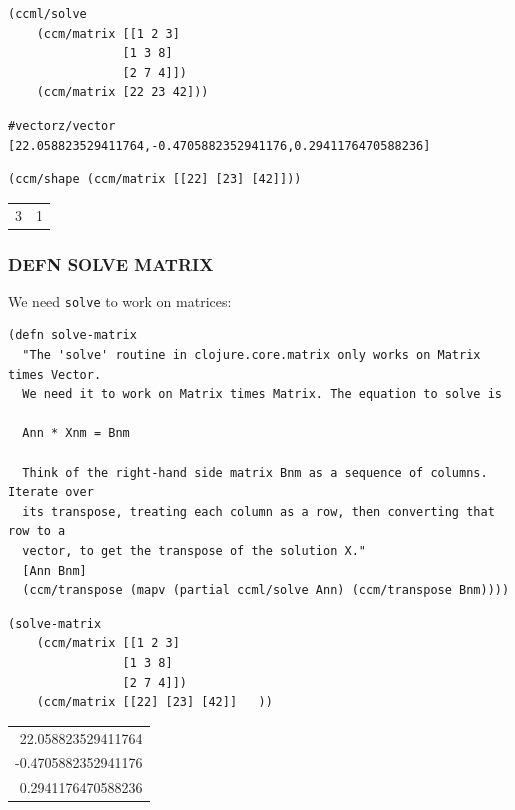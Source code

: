 \documentclass[10pt,oneside,x11names]{article}
\begin{document}
\begin{verbatim}
(ccml/solve
    (ccm/matrix [[1 2 3]
                [1 3 8]
                [2 7 4]])
    (ccm/matrix [22 23 42]))
\end{verbatim}

\begin{verbatim}
#vectorz/vector [22.058823529411764,-0.4705882352941176,0.2941176470588236]
\end{verbatim}


\begin{verbatim}
(ccm/shape (ccm/matrix [[22] [23] [42]]))
\end{verbatim}

\begin{center}
\begin{tabular}{rr}
3 & 1\\
\end{tabular}
\end{center}

\subsubsection{DEFN SOLVE MATRIX}
\label{sec:org232f8b5}

We need \texttt{solve} to work on matrices:

\begin{verbatim}
(defn solve-matrix
  "The 'solve' routine in clojure.core.matrix only works on Matrix times Vector.
  We need it to work on Matrix times Matrix. The equation to solve is

  Ann * Xnm = Bnm

  Think of the right-hand side matrix Bnm as a sequence of columns. Iterate over
  its transpose, treating each column as a row, then converting that row to a
  vector, to get the transpose of the solution X."
  [Ann Bnm]
  (ccm/transpose (mapv (partial ccml/solve Ann) (ccm/transpose Bnm))))
\end{verbatim}

\begin{verbatim}
(solve-matrix
    (ccm/matrix [[1 2 3]
                [1 3 8]
                [2 7 4]])
    (ccm/matrix [[22] [23] [42]]   ))
\end{verbatim}

\begin{center}
\begin{tabular}{r}
22.058823529411764\\
-0.4705882352941176\\
0.2941176470588236\\
\end{tabular}
\end{center}
\end{document}
